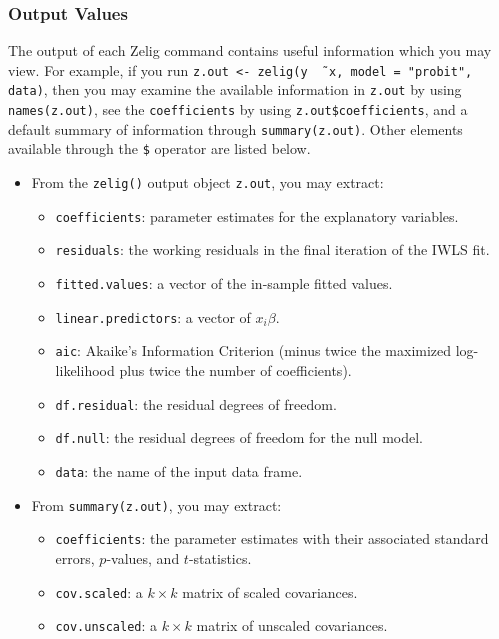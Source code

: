 \documentclass{article}
\begin{document}
\subsubsection{Output Values}

The output of each Zelig command contains useful information which you
may view.  For example, if you run \texttt{z.out <- zelig(y \~\,
  x, model = "probit", data)}, then you may examine the available
information in \texttt{z.out} by using \texttt{names(z.out)},
see the {\tt coefficients} by using {\tt z.out\$coefficients}, and
a default summary of information through \texttt{summary(z.out)}.
Other elements available through the {\tt \$} operator are listed
below.

\begin{itemize}
\item From the {\tt zelig()} output object {\tt z.out}, you may extract:
   \begin{itemize}
   \item {\tt coefficients}: parameter estimates for the explanatory
     variables.
   \item {\tt residuals}: the working residuals in the final iteration
     of the IWLS fit.
   \item {\tt fitted.values}: a vector of the in-sample fitted values.
   \item {\tt linear.predictors}: a vector of $x_{i}\beta$.  
   \item {\tt aic}: Akaike's Information Criterion (minus twice the
     maximized log-likelihood plus twice the number of coefficients).
   \item {\tt df.residual}: the residual degrees of freedom.
   \item {\tt df.null}: the residual degrees of freedom for the null
     model.
   \item {\tt data}: the name of the input data frame.  
   \end{itemize}

\item From {\tt summary(z.out)}, you may extract: 
   \begin{itemize}
   \item {\tt coefficients}: the parameter estimates with their
     associated standard errors, $p$-values, and $t$-statistics.
   \item{\tt cov.scaled}: a $k \times k$ matrix of scaled covariances.
   \item{\tt cov.unscaled}: a $k \times k$ matrix of unscaled
     covariances.  
   \end{itemize}


\end{itemize}
\end{document}
